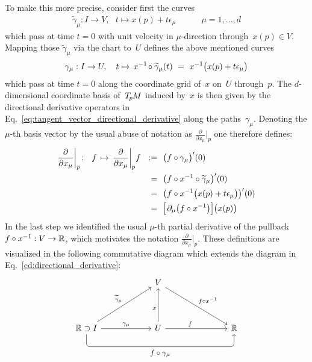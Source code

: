 To make this more precise, consider first the curves
\begin{align}
    \widetilde{\gamma}_\mu: I \to V,\ \ \ t \mapsto x(p) + t \epsilon_\mu \quad\qquad \mu = 1,\dots,d
\end{align}
which pass at time $t=0$ with unit velocity in $\mu$-direction through~$x(p) \in V$.
Mapping those $\widetilde{\gamma}_\mu$ via the chart to~$U$ defines the above mentioned curves
\begin{align}
    \gamma_\mu: I \to U,\ \ \ t \mapsto\,
    x^{-1}\mkern-2mu \circ \widetilde{\gamma}_\mu (t) \ =\ 
    x^{-1} \big( x(p) + t \epsilon_\mu \big)
\end{align}
which pass at time $t=0$ along the coordinate grid of~$x$ on~$U$ through~$p$.
The $d$-dimensional coordinate basis of~$T_{\mkern-1.5mu p}\mkern-.5muM$ induced by~$x$ is then given by the directional derivative operators in Eq.~\eqref{eq:tangent_vector_directional_derivative} along the paths~$\gamma_\mu$.
Denoting the $\mu$-th basis vector by the usual abuse of notation as $\frac{\partial}{\partial x_\mu}\big|_p$ one therefore defines:
\begin{align}\label{eq:coord_basis_def}
    \frac{\partial}{\partial x_\mu} \bigg|_p \!:\ \ f\, \mapsto\,
    \frac{\partial}{\partial x_\mu} \bigg|_p f
    \ \ :=&\ \ \big(f \circ \gamma_\mu \big)'(0) \notag \\
    \ \  =&\ \ \big(f \circ x^{-1} \circ \widetilde{\gamma}_\mu \big)'(0) \notag \\
    \ \  =&\ \ \big(f \circ x^{-1}\big( x(p) + t\epsilon_\mu \big) \big)'(0) \notag \\
    \ \  =&\ \ \pig[\mkern1.5mu \partial_\mu \big(f \circ x^{-1} \big)\pig] \big(x(p)\big)
\end{align}
In the last step we identified the usual $\mu$-th partial derivative of the pullback $f\circ x^{-1}: V \to \mathbb{R}$, which motivates the notation $\frac{\partial}{\partial x_\mu}\big|_p$.
These definitions are visualized in the following commutative diagram which extends the diagram in Eq.~\eqref{cd:directional_derivative}:
\begin{equation}
    \begin{tikzcd}[row sep=4.em, column sep=6.em]
        & V     \arrow[rd, "f\circ x^{-1}"]
        \\
          \R \supset I
                \arrow[r, "\gamma_\mu"]
                \arrow[ru, "\widetilde{\gamma}_\mu"]
                \arrow[rr, rounded corners, to path={ 
                        |- node[below, pos=.75]{\small$f \circ \gamma_\mu$} ([yshift=-3.5ex]\tikztotarget.south)
                        -- (\tikztotarget.south)
                        }]
        & U     \arrow[r, pos=.4, "f"]
                \arrow[u, pos=.4, "x"]
        &[1.4em] \R
    \end{tikzcd}
\end{equation}




